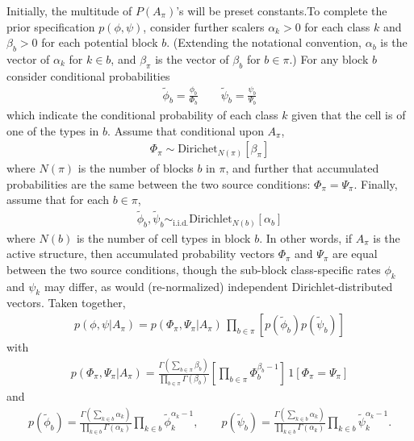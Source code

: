 \documentclass[11pt]{amsart}
\begin{document}
Initially, the multitude of $P(A_\pi)$'s will be preset constants.To complete the prior specification $p(\phi,\psi)$, consider further scalers
$\alpha_k>0$ for each class $k$ and $\beta_b>0$ for each potential block $b$.
(Extending the notational convention, $\alpha_b$ is the vector of $\alpha_k$
for $k\in b$, and $\beta_\pi$ is the vector of $\beta_b$ for $b \in \pi$.)
For any block $b$ consider conditional probabilities
\begin{eqnarray*}
\tilde{\phi}_b = \frac{\phi_b}{\Phi_b} \qquad \tilde{\psi}_b = \frac{\psi_b}{\Psi_b}
\end{eqnarray*}
which indicate the conditional probability of each class $k$ given that
the cell is of one of the types in $b$.  Assume that conditional upon 
$A_\pi$,
\begin{eqnarray*}
\Phi_\pi \sim \text{Dirichet}_{N(\pi)}[   \beta_\pi   ]
\end{eqnarray*}
where $N(\pi)$ is the number of blocks $b$ in $\pi$,
and further that accumulated probabilities are the same between
the two source conditions: $\Phi_\pi = \Psi_\pi$.
Finally, assume that for each $b \in \pi$,
\begin{eqnarray*}
\tilde \phi_b, \tilde \psi_b \sim_{\text{i.i.d.}}
  \text{Dirichlet}_{N(b)}[ \alpha_b ]
\end{eqnarray*}
where $N(b)$ is the number of cell types in block $b$.
In other words, if $A_\pi$ is the active structure, then
accumulated probability vectors $\Phi_\pi$ and $\Psi_\pi$ are equal
between the two source conditions, though the sub-block class-specific
rates $\phi_k$ and $\psi_k$ may differ, as would (re-normalized)
independent Dirichlet-distributed vectors.
Taken together,
\begin{eqnarray*}
p(\phi,\psi|A_\pi) =
         p( \Phi_\pi, \Psi_\pi | A_\pi ) \, \prod_{b \in \pi}  \left[
         p( \tilde \phi_b ) p( \tilde \psi_b ) \right]
\end{eqnarray*}
with
\begin{eqnarray*}
p( \Phi_\pi, \Psi_\pi | A_\pi )
= \frac{\Gamma(\sum_{b\in \pi} \beta_b)}{
 \prod_{b \in \pi} \Gamma( \beta_b )} \left[\prod_{b \in \pi} \Phi_b^{\beta_b-1} \right] \,
 1\left[ \Phi_\pi = \Psi_\pi \right]
\end{eqnarray*}
and
\begin{eqnarray*}
p( \tilde \phi_b ) =
\frac{ \Gamma( \sum_{k\in b} \alpha_k ) }{ \prod_{k\in b} \Gamma(\alpha_k) }
 \prod_{k \in b} \tilde \phi_k^{\alpha_k -1 },
\qquad
p( \tilde \psi_b )
=
\frac{ \Gamma( \sum_{k\in b} \alpha_k ) }{ \prod_{k\in b} \Gamma(\alpha_k) }
\prod_{k \in b} \tilde \psi_k^{\alpha_k -1 }.
\end{eqnarray*}
\end{document}
